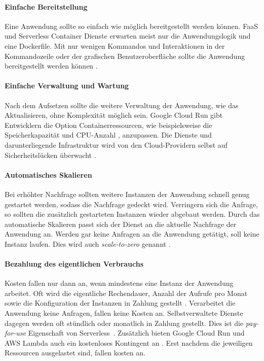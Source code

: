 \paragraph{Einfache Bereitstellung} Eine Anwendung sollte so einfach
wie möglich bereitgestellt werden können.
FaaS und Serverless Container Dienste erwarten meist nur die
Anwendungslogik und eine Dockerfile.
Mit nur wenigen Kommandos und Interaktionen in der Kommandozeile oder
der grafischen Benutzeroberfläche sollte die Anwendung
bereitgestellt werden können \cite{ServerlessTrends}.

\paragraph{Einfache Verwaltung und Wartung} 
Nach dem Aufsetzen sollte die weitere Verwaltung der Anwendung, wie das Aktualisieren,
ohne Komplexität möglich sein. Google Cloud Run gibt Entwicklern die Option
Containerressourcen, wie beispielsweise die Speicherkapazität \cite{CloudRunMemLimits}
und CPU-Anzahl \cite{CloudRunCpuAlloc}, anzupassen. Die Dienste und darunterliegende
Infrastruktur wird von den Cloud-Providern selbst auf Sicherheitslücken überwacht \cite{ServerlessTrends}.

\paragraph{Automatisches Skalieren} Bei erhöhter Nachfrage sollten weitere Instanzen der Anwendung
schnell genug gestartet werden, sodass die Nachfrage gedeckt wird.
Verringern sich die Anfrage, so sollten die zusätzlich gestarteten Instanzen wieder abgebaut werden.
Durch das automatische Skalieren passt sich der Dienst an die aktuelle Nachfrage der Anwendung an.
Werden gar keine Anfragen an die Anwendung getätigt, soll keine Instanz laufen.
Dies wird auch \emph{scale-to-zero} genannt \cite{ServerlessTrends}.

\paragraph{Bezahlung des eigentlichen Verbrauchs} Kosten fallen nur dann an, wenn mindestens eine
Instanz der Anwendung arbeitet. Oft wird die eigentliche Rechendauer, Anzahl der
Aufrufe pro Monat sowie die Konfiguration der Instanzen in Zahlung gestellt \cite{ServerlessTrends}.
Verarbeitet die Anwendung keine Anfragen, fallen keine Kosten an.
Selbstverwaltete Dienste dagegen werden oft stündlich oder monatlich in Zahlung gestellt.
Dies ist die \emph{pay-for-use} Eigenschaft von Serverless \cite{Firecracker}.
Zusätzlich bieten Google Cloud Run und AWS Lambda auch ein kostenloses Kontingent an
\cite{CloudRunPricing} \cite{AWSLambda}. Erst nachdem die jeweiligen Ressourcen
ausgelastet sind, fallen kosten an.

